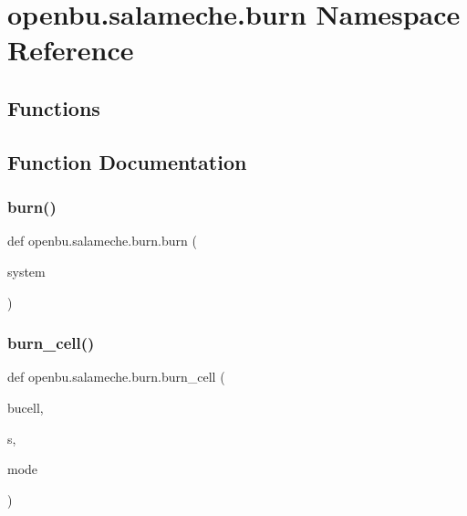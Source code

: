 \hypertarget{namespaceopenbu_1_1salameche_1_1burn}{}\section{openbu.\+salameche.\+burn Namespace Reference}
\label{namespaceopenbu_1_1salameche_1_1burn}
\subsection*{Functions}


\subsection{Function Documentation}
\mbox{\label{namespaceopenbu_1_1salameche_1_1burn_ae3e217d23c1e7cdd1e2e4a58acb68b14}} 
\subsubsection{\texorpdfstring{burn()}{burn()}}
{\footnotesize\ttfamily def openbu.\+salameche.\+burn.\+burn (\begin{DoxyParamCaption}\item[{}]{system }\end{DoxyParamCaption})}

\mbox{\label{namespaceopenbu_1_1salameche_1_1burn_af4d4ff99d26f2d7dadf36bd6974a53cc}} 
\subsubsection{\texorpdfstring{burn\+\_\+cell()}{burn\_cell()}}
{\footnotesize\ttfamily def openbu.\+salameche.\+burn.\+burn\+\_\+cell (\begin{DoxyParamCaption}\item[{}]{bucell,  }\item[{}]{s,  }\item[{}]{mode }\end{DoxyParamCaption})}


